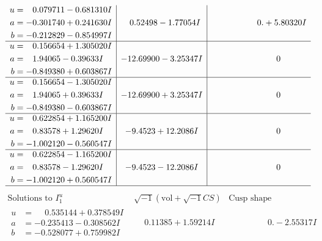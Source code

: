 \documentclass[1p]{elsarticle_modified}
\theoremstyle{definition}
\newcommand{\I}{\sqrt{-1}}
\begin{document}
$$\begin{array}{c|c|c}
\begin{aligned}
u &= \phantom{-}0.079711 - 0.681310 I \\
a &= -0.301740 + 0.241630 I \\
b &= -0.212829 - 0.854997 I\end{aligned}
 & \phantom{-}0.52498 - 1.77054 I & \phantom{-0.000000 -}0. + 5.80320 I \\ \hline\begin{aligned}
u &= \phantom{-}0.156654 + 1.305020 I \\
a &= \phantom{-}1.94065 - 0.39633 I \\
b &= -0.849380 + 0.603867 I\end{aligned}
 & -12.69900 - 3.25347 I & \phantom{-0.000000 } 0 \\ \hline\begin{aligned}
u &= \phantom{-}0.156654 - 1.305020 I \\
a &= \phantom{-}1.94065 + 0.39633 I \\
b &= -0.849380 - 0.603867 I\end{aligned}
 & -12.69900 + 3.25347 I & \phantom{-0.000000 } 0 \\ \hline\begin{aligned}
u &= \phantom{-}0.622854 + 1.165200 I \\
a &= \phantom{-}0.83578 + 1.29620 I \\
b &= -1.002120 - 0.560547 I\end{aligned}
 & -9.4523 + 12.2086 I & \phantom{-0.000000 } 0 \\ \hline\begin{aligned}
u &= \phantom{-}0.622854 - 1.165200 I \\
a &= \phantom{-}0.83578 - 1.29620 I \\
b &= -1.002120 + 0.560547 I\end{aligned}
 & -9.4523 - 12.2086 I & \phantom{-0.000000 } 0\\
 \hline 
 \end{array}$$\newpage$$\begin{array}{c|c|c}  
\text{Solutions to }I^u_{1}& \I (\text{vol} + \sqrt{-1}CS) & \text{Cusp shape}\\
 \hline 
\begin{aligned}
u &= \phantom{-}0.535144 + 0.378549 I \\
a &= -0.235413 - 0.308562 I \\
b &= -0.528077 + 0.759982 I\end{aligned}
 & \phantom{-}0.11385 + 1.59214 I & \phantom{-0.000000 } 0. - 2.55317 I \\ \hline\begin{aligned}

\end{aligned}
\end{array}$$
\end{document}
